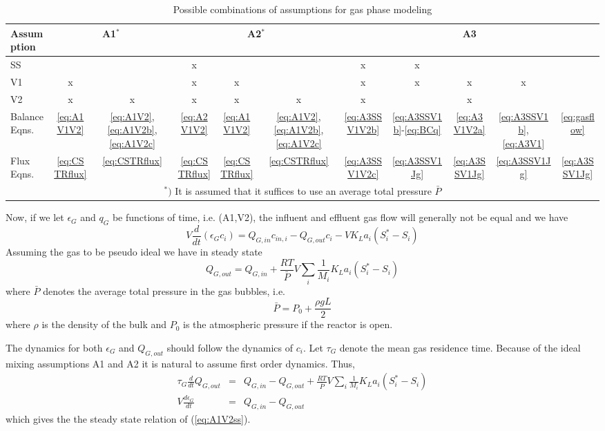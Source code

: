 \vspace{0.5cm}
\begin{table}[htb]
\caption{\label{table:assumptions}{Possible combinations of assumptions for gas phase modeling}}
\footnotesize
\begin{center}
\begin{tabular}{l|cc|ccc|ccccc}
\hline
Assumption & \multicolumn{2}{|c|}{A1$^\ast$}&\multicolumn{3}{|c|}{A2$^\ast$}& \multicolumn{5}{|c}{A3}\tspace\\
\hline
SS &   &   & x &   &   & x & x &   &   &   \\
V1 & x &   & x & x &   & x & x & x & x &   \\
V2 & x & x & x & x & x & x &   & x &   &   \\
\hline
Balance Eqns. & \ref{eq:A1V1V2} &\ref{eq:A1V2},\ref{eq:A1V2b},\ref{eq:A1V2c} & \ref{eq:A2V1V2}  &\ref{eq:A1V1V2} &\ref{eq:A1V2},\ref{eq:A1V2b},\ref{eq:A1V2c} & \ref{eq:A3SSV1V2b} & \ref{eq:A3SSV1b}-\ref{eq:BCq}  & \ref{eq:A3V1V2a} & \ref{eq:A3SSV1b}, \ref{eq:A3V1}  & \ref{eq:gasflow}\\
Flux Eqns. & \ref{eq:CSTRflux} &\ref{eq:CSTRflux} & \ref{eq:CSTRflux}& \ref{eq:CSTRflux}&\ref{eq:CSTRflux} &\ref{eq:A3SSV1V2c}  & \ref{eq:A3SSV1Jg} &\ref{eq:A3SSV1Jg} &\ref{eq:A3SSV1Jg} &\ref{eq:A3SSV1Jg} \\
\hline
\multicolumn{11}{c}{$^\ast)$ It is assumed that it suffices to use an average total pressure $\bar{P}$}\tspaceu
\end{tabular}
\end{center}
\end{table}

Now, if we let $\epsilon_G$ and $q_G$ be functions of time, i.e. (A1,V2), the influent and effluent gas flow will generally not be equal and we have
\begin{equation}\label{eq:A1V2}
V\frac{d}{dt}(\epsilon_Gc_i)=Q_{G,in}c_{in,i}-Q_{G,out}c_i-VK_La_i(S_i^\ast-S_i)
\end{equation}
Assuming the gas to be pseudo ideal we have in steady state
\begin{equation}\label{eq:A1V2ss}
Q_{G,out}=Q_{G,in}+\frac{RT}{\bar{P}}V\sum\limits_i\frac{1}{M_i}K_La_i(S_i^\ast-S_i)
\end{equation}
where $\bar{P}$ denotes the average total pressure in the gas bubbles, i.e.
$$
\bar{P}=P_0+\frac{\rho gL}{2}
$$
where $\rho$ is the density of the bulk and $P_0$ is the atmospheric pressure if the reactor is open.

The dynamics for both $\epsilon_G$ and $Q_{G,out}$ should follow the dynamics of $c_i$. Let $\tau_G$ denote the mean gas residence time. Because of the ideal mixing assumptions A1 and A2 it is natural to assume first order dynamics. Thus,
\begin{eqnarray}
\tau_G \frac{d}{dt}Q_{G,out} & = & Q_{G,in}-Q_{G,out}+\frac{RT}{\bar{P}}V\sum\limits_i\frac{1}{M_i}K_La_i(S_i^\ast-S_i)\label{eq:A1V2b}\\
V\frac{d\epsilon_G}{dt} & = & Q_{G,in}-Q_{G,out}\label{eq:A1V2c}
\end{eqnarray}
which gives the the steady state relation of (\ref{eq:A1V2ss}).

